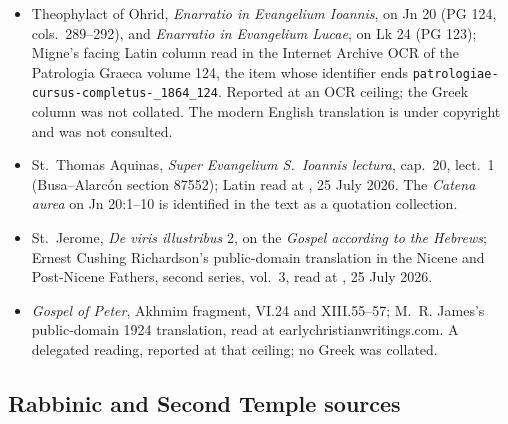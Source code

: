 {\begin{itemize}[itemsep=0pt,parsep=0pt,topsep=0.05em]
24:12 (PL 92, cols.\ 621B and 625A--B); Latin read in the Corpus Corporum
transcription of Migne at
,
25 July 2026, with Migne column markers embedded in the transcription. No page
image of these columns was reachable. The related negative result about Migne's
Bede homiliary is reported at a delegated ceiling in section~7.
\item Theophylact of Ohrid, \emph{Enarratio in Evangelium Ioannis}, on Jn 20
(PG 124, cols.\ 289--292), and \emph{Enarratio in Evangelium Lucae}, on Lk 24
(PG 123); Migne's facing Latin column read in the Internet Archive OCR of the
Patrologia Graeca volume 124,
the item whose identifier ends \texttt{patrologiae-cursus-completus-\_1864\_124}.
Reported at an OCR ceiling; the Greek column was not collated. The modern
English translation is under copyright and was not consulted.
\item St.\ Thomas Aquinas, \emph{Super Evangelium S.\ Ioannis lectura}, cap.\
20, lect.\ 1 (Busa--Alarc\'on section 87552); Latin read at
,
25 July 2026. The \emph{Catena aurea} on Jn 20:1--10 is identified in the text
as a quotation collection.
\item St.\ Jerome, \emph{De viris illustribus} 2, on the \emph{Gospel according
to the Hebrews}; Ernest Cushing Richardson's public-domain translation in the
Nicene and Post-Nicene Fathers, second series, vol.~3, read at
,
25 July 2026.
\item \emph{Gospel of Peter}, Akhmim fragment, VI.24 and XIII.55--57; M.~R.
James's public-domain 1924 translation, read at earlychristianwritings.com. A
delegated reading, reported at that ceiling; no Greek was collated.
\end{itemize}}

\subsection*{Rabbinic and Second Temple sources}

